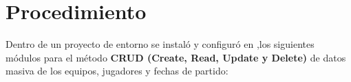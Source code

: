 \chapter{Procedimiento}

Dentro de un proyecto de entorno se instaló y configuró en  \textendash{} ,los siguientes módulos para el método \textbf{CRUD (Create, Read, Update y Delete)} de datos masiva de los equipos, jugadores y fechas de partido:


